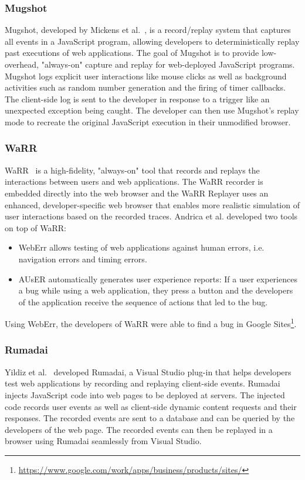\subsubsection{Mugshot}

Mugshot, developed by Mickens et al.~\cite{mugshot2010}, is a record/replay system that captures all events in a JavaScript program, allowing developers to deterministically replay past executions of web applications. The goal of Mugshot is to provide low-overhead, "always-on" capture and replay for web-deployed JavaScript programs. Mugshot logs explicit user interactions like mouse clicks as well as background activities such as random number generation and the firing of timer callbacks. The client-side log is sent to the developer in response to a trigger like an unexpected exception being caught. The developer can then use Mugshot's replay mode to recreate the original JavaScript execution in their unmodified browser. 

\subsubsection{WaRR}

WaRR~\cite{warr2011} is a high-fidelity, "always-on" tool that records and replays the interactions between users and web applications. The WaRR recorder is embedded directly into the web browser and the WaRR Replayer uses an enhanced, developer-specific web browser that enables more realistic simulation of user interactions based on the recorded traces. Andrica et al. developed two tools on top of WaRR:
\begin{itemize}
	\item WebErr allows testing of web applications against human errors, i.e. navigation errors and timing errors.
	\item AUsER automatically generates user experience reports: If a user experiences a bug while using a web application, they press a button and the developers of the application receive the sequence of actions that led to the bug.
\end{itemize}
Using WebErr, the developers of WaRR were able to find a bug in Google Sites\footnote{\url{https://www.google.com/work/apps/business/products/sites/}}.

\subsubsection{Rumadai}

Yildiz et al.~\cite{rumadai2012} developed Rumadai, a Visual Studio plug-in that helps developers test web applications by recording and replaying client-side events. Rumadai injects JavaScript code into web pages to be deployed at servers. The injected code records user events as well as client-side dynamic content requests and their responses. The recorded events are sent to a database and can be queried by the developers of the web page. The recorded events can then be replayed in a browser using Rumadai seamlessly from Visual Studio.

